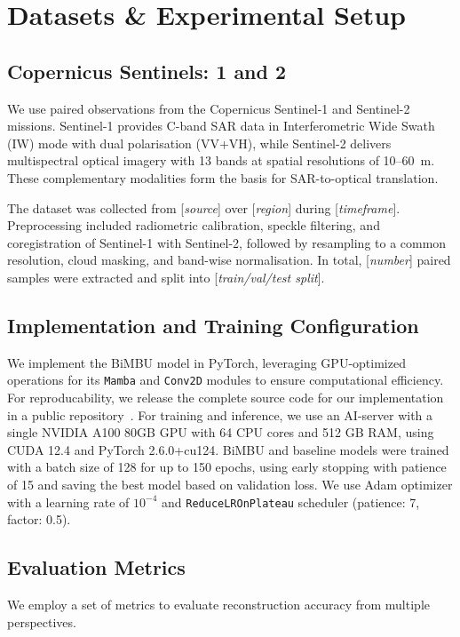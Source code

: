 \section{Datasets \& Experimental Setup}

\subsection{Copernicus Sentinels: 1 and 2}

We use paired observations from the Copernicus Sentinel-1 and Sentinel-2 missions. Sentinel-1 provides C-band SAR data in Interferometric Wide Swath (IW) mode with dual polarisation (VV+VH), while Sentinel-2 delivers multispectral optical imagery with 13 bands at spatial resolutions of 10–60~m. These complementary modalities form the basis for SAR-to-optical translation.

The dataset was collected from [\textit{source}] over [\textit{region}] during [\textit{timeframe}]. Preprocessing included radiometric calibration, speckle filtering, and coregistration of Sentinel-1 with Sentinel-2, followed by resampling to a common resolution, cloud masking, and band-wise normalisation. In total, [\textit{number}] paired samples were extracted and split into [\textit{train/val/test split}].

\subsection{Implementation and Training Configuration}
We implement the BiMBU model in PyTorch, leveraging GPU-optimized operations for its \texttt{Mamba} and \texttt{Conv2D} modules to ensure computational efficiency. For reproducability, we release the complete source code for our implementation in a public repository~\cite{repo}. For training and inference, we use an AI-server with a single NVIDIA A100 80GB GPU with 64 CPU cores and 512 GB RAM, using CUDA 12.4 and PyTorch 2.6.0+cu124. BiMBU and baseline models were trained with a batch size of 128 for up to 150 epochs, using early stopping with patience of 15 and saving the best model based on validation loss. We use Adam optimizer with a learning rate of $10^{-4}$ and \texttt{ReduceLROnPlateau} scheduler (patience: 7, factor: 0.5).

\subsection{Evaluation Metrics}
We employ a set of metrics to evaluate reconstruction accuracy from multiple perspectives. 

